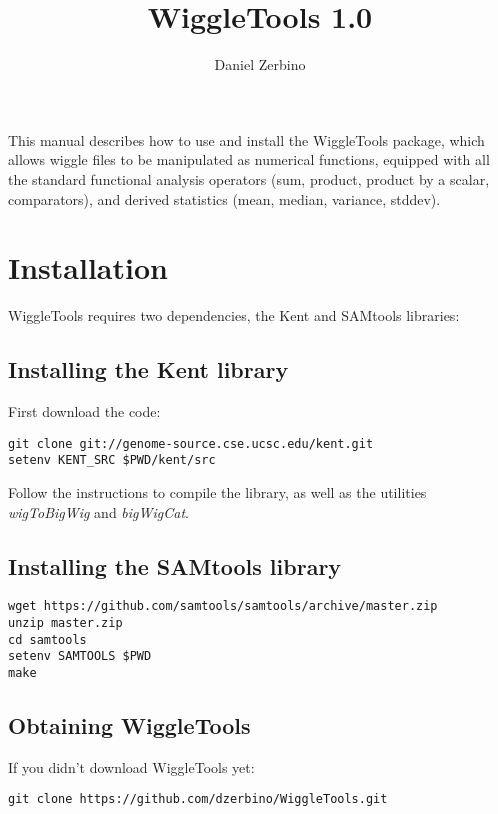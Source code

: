 \documentclass[12pt]{article}
\begin{document}
\title{WiggleTools 1.0}
\author{Daniel Zerbino}
\date{}
\maketitle

This manual describes how to use and install the WiggleTools package, which allows wiggle files to be manipulated as numerical functions, equipped with all the standard functional analysis operators (sum, product, product by a scalar, comparators), and derived statistics (mean, median, variance, stddev).

\tableofcontents

\section{Installation}

WiggleTools requires two dependencies, the Kent and SAMtools libraries:

\subsection{Installing the Kent library}

First download the code:

\begin{verbatim}
git clone git://genome-source.cse.ucsc.edu/kent.git
setenv KENT_SRC $PWD/kent/src
\end{verbatim}

Follow the instructions to compile the library, as well as the utilities \emph{wigToBigWig} and \emph{bigWigCat}.

\subsection{Installing the SAMtools library}

\begin{verbatim}
wget https://github.com/samtools/samtools/archive/master.zip
unzip master.zip
cd samtools
setenv SAMTOOLS $PWD
make
\end{verbatim}

\subsection{Obtaining WiggleTools}

If you didn't download WiggleTools yet:

\begin{verbatim}
git clone https://github.com/dzerbino/WiggleTools.git
\end{verbatim}
\end{document}
